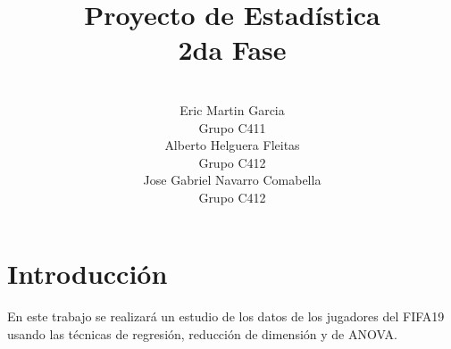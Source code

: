 \documentclass[a4paper,10pt,twocolumn]{article}
\title{Proyecto de Estad\'istica \\ 2da Fase}
\author{\\
	\name Eric Martin Garcia \\ \addr Grupo C411 \\
	\name Alberto Helguera Fleitas \\ \addr Grupo C412 \\
	\name Jose Gabriel Navarro Comabella \\ \addr Grupo C412 }
\begin{document}



\section*{Introducción}\label{sec:intro}
En este trabajo se realizará un estudio de los datos de los jugadores del FIFA19 usando las técnicas de regresión, reducción de dimensión y de ANOVA.
\end{document}
